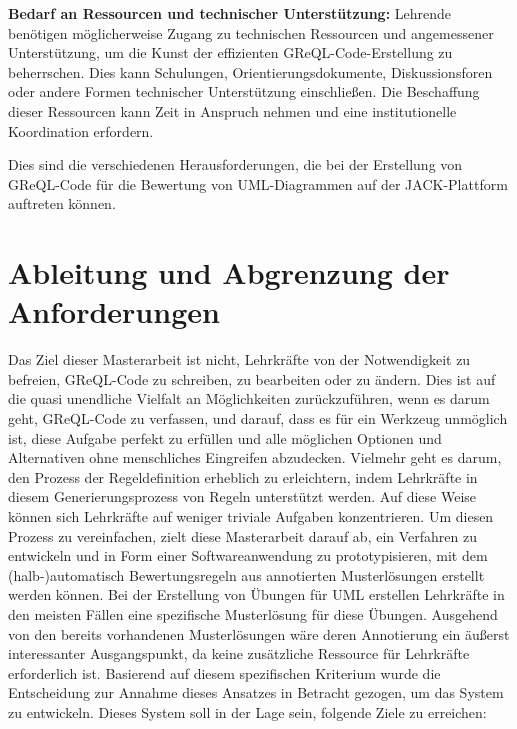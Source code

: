\vspace{0.5cm}
\textbf{Bedarf an Ressourcen und technischer Unterstützung:}
Lehrende benötigen möglicherweise Zugang zu technischen Ressourcen und angemessener Unterstützung, um die Kunst der effizienten GReQL-Code-Erstellung zu beherrschen. Dies kann Schulungen, Orientierungsdokumente, Diskussionsforen oder andere Formen technischer Unterstützung einschließen. Die Beschaffung dieser Ressourcen kann Zeit in Anspruch nehmen und eine institutionelle Koordination erfordern.

\vspace{0.5cm}
Dies sind die verschiedenen Herausforderungen, die bei der Erstellung von GReQL-Code für die Bewertung von UML-Diagrammen auf der JACK-Plattform auftreten können.


\section{Ableitung und Abgrenzung der Anforderungen}


Das Ziel dieser Masterarbeit ist nicht, Lehrkräfte von der Notwendigkeit zu befreien, GReQL-Code zu schreiben, zu
bearbeiten oder zu ändern. Dies ist auf die quasi unendliche Vielfalt an Möglichkeiten zurückzuführen, wenn es darum
geht, GReQL-Code zu verfassen, und darauf, dass es für ein Werkzeug unmöglich ist, diese Aufgabe perfekt zu erfüllen
und alle möglichen Optionen und Alternativen ohne menschliches Eingreifen abzudecken. Vielmehr geht es darum, den
Prozess der Regeldefinition erheblich zu erleichtern, indem Lehrkräfte in diesem Generierungsprozess von Regeln
unterstützt werden. Auf diese Weise können sich Lehrkräfte auf weniger triviale Aufgaben konzentrieren. Um diesen Prozess
zu vereinfachen, zielt diese Masterarbeit darauf ab, ein Verfahren zu entwickeln und in Form einer Softwareanwendung zu
prototypisieren, mit dem (halb-)automatisch Bewertungsregeln aus annotierten Musterlösungen erstellt werden können.
Bei der Erstellung von Übungen für UML erstellen Lehrkräfte in den meisten Fällen eine spezifische Musterlösung für
diese Übungen. Ausgehend von den bereits vorhandenen Musterlösungen wäre deren Annotierung ein äußerst interessanter
Ausgangspunkt, da keine zusätzliche Ressource für Lehrkräfte erforderlich ist. Basierend auf diesem spezifischen
Kriterium wurde die Entscheidung zur Annahme dieses Ansatzes in Betracht gezogen, um das System zu entwickeln. Dieses
System soll in der Lage sein, folgende Ziele zu erreichen:

